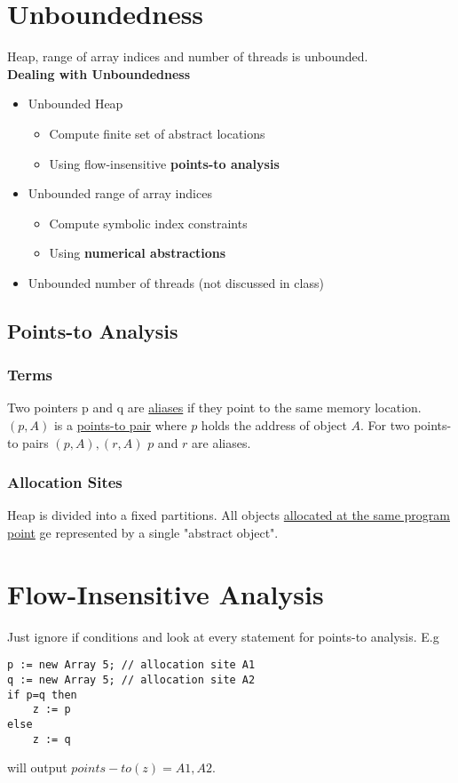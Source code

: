 \section{Unboundedness}
Heap, range of array indices and number of threads is unbounded. \\
\textbf{Dealing with Unboundedness}
\begin{itemize}
\item Unbounded Heap
\begin{itemize}
\item Compute finite set of abstract locations
\item Using flow-insensitive \textbf{points-to analysis}
\end{itemize}
\item Unbounded range of array indices
\begin{itemize}
\item Compute symbolic index constraints
\item Using \textbf{numerical abstractions}
\end{itemize}
\item Unbounded number of threads (not discussed in class)
\end{itemize}
\subsection{Points-to Analysis}
\subsubsection{Terms}
Two pointers p and q are \underline{aliases} if they point to the same memory location. $(p,A)$ is a \underline{points-to pair} where $p$ holds the address of object $A$. For two points-to pairs $(p,A),(r,A)$ $p$ and $r$ are aliases.
\subsubsection{Allocation Sites}
Heap is divided into a fixed partitions. All objects \underline{allocated at the same program point} ge represented by a single "abstract object".
\section{Flow-Insensitive Analysis}
Just ignore if conditions and look at every statement for points-to analysis. E.g
\begin{verbatim}
p := new Array 5; // allocation site A1
q := new Array 5; // allocation site A2
if p=q then
	z := p
else
	z := q
\end{verbatim}
will output $points-to(z)={A1, A2}$.

